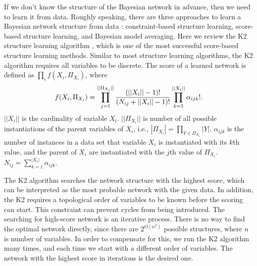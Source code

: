 {If we don't know the structure of the Bayesian network in advance, then we need to learn it from data. Roughly speaking, there are three approaches to learn a Bayesian network structure from data \citep[see][chap.~18]{PGM_2009}: constraint-based structure learning, score-based structure learning, and Bayesian model averaging. Here we review the K2 structure learning algorithm \citep{K2}, which is one of the most successful score-based structure learning methods. Similar to most structure learning algorithms, the K2 algorithm requires all variables to be discrete. The score of a learned network is defined as $\prod_i f(X_i, \Pi_{X_i})$, where
\begin{align}
f(X_i, \Pi_{X_i}) = \prod_{j=1}^{||\Pi_{X_i}||} {{(||X_i||-1)!}\over{(N_{ij} + ||X_i||-1)!}} \prod_{k=1}^{||X_i||} \alpha_{ijk}!.
\end{align}
$||X_i||$ is the cardinality of variable $X_i$. $||\Pi_{X_i}||$ is number of all possible instantiations of the parent variables of $X_i$, i.e., $|\Pi_{X_i}| = \prod_{Y \in \Pi_{X_i}} |Y|$. $\alpha_{ijk}$ is the number of instances in a data set that variable $X_i$ is instantiated with its $k$th value, and the parent of $X_i$ are instantiated with the $j$th value of $\Pi_{X_i}$. $N_{ij} = \sum_{k=1}^{|X_i|} \alpha_{ijk}$.

The K2 algorithm searches the network structure with the highest score, which can be interpreted as the most probable network with the given data. In addition, the K2 requires a topological order of variables to be known before the scoring can start. This constraint can prevent cycles from being introduced. The searching for high-score network is an iterative process. There is no way to find the optimal network directly, since there are $2^{O(n^2)}$ possible structures, where $n$ is number of variables. In order to compensate for this, we run the K2 algorithm many times, and each time we start with a different order of variables. The network with the highest score in iterations is the desired one.

}
